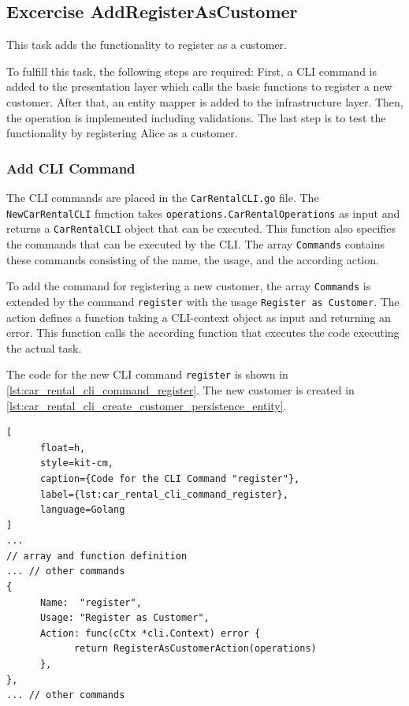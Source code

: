 \subsection{Excercise AddRegisterAsCustomer}
\label{sec:exercise_add_register_as_customer}
This task adds the functionality to register as a customer.

To fulfill this task, the following steps are required:
First, a CLI command is added to the presentation layer which calls the basic functions to register a new customer.
After that, an entity mapper is added to the infrastructure layer.
Then, the operation is implemented including validations.
The last step is to test the functionality by registering Alice as a customer.

\subsubsection*{Add CLI Command}
The CLI commands are placed in the \texttt{CarRentalCLI.go} file.
The \texttt{NewCarRentalCLI} function takes \texttt{operations.CarRentalOperations} as input and returns a \texttt{CarRentalCLI} object that can be executed.
This function also specifies the commands that can be executed by the CLI.
The array \texttt{Commands} contains these commands consisting of the name, the usage, and the according action.

To add the command for registering a new customer, the array \texttt{Commands} is extended by the command \texttt{register} with the usage \texttt{Register as Customer}.
The action defines a function taking a CLI-context object as input and returning an error.
This function calls the according function that executes the code executing the actual task.

The code for the new CLI command \texttt{register} is shown in \autoref{lst:car_rental_cli_command_register}.
The new customer is created in \autoref{lst:car_rental_cli_create_customer_persistence_entity}.

\begin{lstlisting}[
      float=h,
      style=kit-cm,
      caption={Code for the CLI Command "register"},
      label={lst:car_rental_cli_command_register},
      language=Golang
]
...
// array and function definition
... // other commands
{
      Name:  "register",
      Usage: "Register as Customer",
      Action: func(cCtx *cli.Context) error {
            return RegisterAsCustomerAction(operations)
      },
},
... // other commands
\end{lstlisting}

